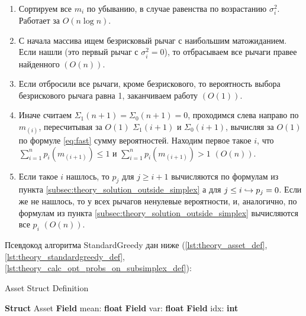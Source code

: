 \begin{enumerate}
    \item Сортируем все $m_i$ по убыванию, в случае равенства по возрастанию $\sigma_i^2$. Работает за $O(n \log n)$.
    \item С начала массива ищем безрисковый рычаг с наибольшим матожиданием. Если нашли (это первый рычаг с $\sigma_i^2 = 0$), то отбрасываем все рычаги правее найденного $\left(O(n) \right)$. 
    \item Если отбросили все рычаги, кроме безрискового, то вероятность выбора безрискового рычага равна 1, заканчиваем работу $\left( O(1) \right)$.
    \item Иначе считаем $\Sigma_1(n+1) = \Sigma_0(n+1) = 0$, проходимся слева направо по $m_{(i)}$, пересчитывая за $O(1)$ $\Sigma_1(i+1)$ и $\Sigma_0(i+1)$, вычисляя за $O(1)$ по формуле \ref{eq:fast} сумму вероятностей. Находим первое такое $i$, что $\sum_{i=1}^n p_i(m_{(i+1)}) \leq 1$ и $\sum_{i=1}^n p_i(m_{(i+1)}) > 1$ $\left( O(n) \right)$.
    \item Если такое $i$ нашлось, то $p_j$ для $j \geq i + 1$ вычисляются по формулам из пункта \ref{subsec:theory_solution_outside_simplex} а для $j \leq i \hookrightarrow p_j = 0$. Если же не нашлось, то у всех рычагов ненулевые вероятности, и, аналогично, по формулам из пункта \ref{subsec:theory_solution_outside_simplex} вычисляются все $p_i$ $\left( O(n) \right)$.
\end{enumerate}

Псевдокод алгоритма StandardGreedy дан ниже (\ref{lst:theory_asset_def}, \ref{lst:theory_standardgreedy_def}, \ref{lst:theory_calc_opt_probs_on_subsimplex_def}):

\begin{algorithm}
\caption{Asset Struct Definition}
\label{lst:theory_asset_def}
\begin{algorithmic}[1]
\STATE \textbf{Struct} Asset
\STATE \quad \textbf{Field} mean: \textbf{float}
\STATE \quad \textbf{Field} var: \textbf{float}
\STATE \quad \textbf{Field} idx: \textbf{int}
\end{algorithmic}
\end{algorithm}

